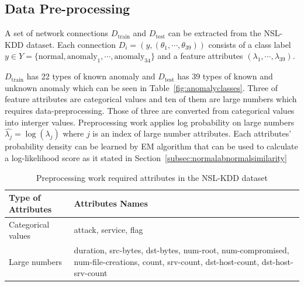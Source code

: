 
\subsection{Data Pre-processing}
\label{subsec:preprocessing}
A set of network connections $D_{\text{train}}$ and $D_{\text{test}}$ can be extracted from the NSL-KDD dataset. 
Each connection $D_i = (y, (\theta_{1}, \cdots, \theta_{39}))$ consists of a class label \\ 
$y \in Y=\{\text{normal},\text{anomaly}_1,\cdots,\text{anomaly}_{34}\}$ and a feature attributes $(\lambda_1,\cdots,\lambda_{39})$. 

$D_{\text{train}}$ has 22 types of known anomaly and $D_{\text{test}}$ has 39 types of known and unknown anomaly which can be seen in Table~\ref{fig:anomalyclasses}. 
Three of feature attributes are categorical values and ten of them are large numbers which requires data-preprocessing. 
Those of three are converted from categorical values into interger values. 
Preprocessing work applies log probability on large numbers $\hat{\lambda_{j}} = \log (\lambda_{j})$ where $j$ is an index of large number attributes. 
Each attributes' probability density can be learned by EM algorithm that can be used to calculate a log-likelihood score as it stated in Section~\ref{subsec:normalabnormalsimilarity}
\begin{table}[h]
\begin{center}
\begin{tabular}{| l | p{10cm} |}
\hline
Type of Attributes & Attributes Names \\
\hline
Categorical values & attack, service, flag \\
\hline
Large numbers & duration, src-bytes, dst-bytes, num-root, num-compromised, num-file-creations, count, srv-count, dst-host-count, dst-host-srv-count
\\
\hline
\end{tabular}
\end{center}
\caption{Preprocessing work required attributes in the NSL-KDD dataset}
\label{fig:preprocessing}
\end{table}

